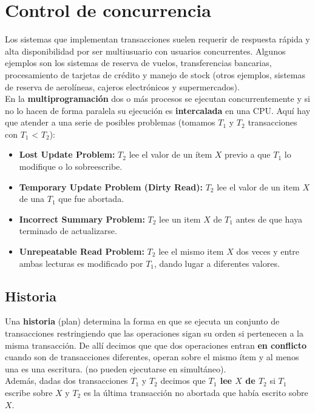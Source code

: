 \section*{Control de concurrencia}
Los sistemas que implementan transacciones suelen requerir de respuesta rápida y alta disponibilidad por ser multiusuario con usuarios concurrentes. Algunos ejemplos son los sistemas de reserva de vuelos, transferencias bancarias, procesamiento de tarjetas de crédito y manejo de stock (otros ejemplos, sistemas de reserva de aerolíneas, cajeros electrónicos y supermercados). \\
En la \textbf{multiprogramación} dos o más procesos se ejecutan concurrentemente y si no lo hacen de forma paralela su ejecución es \textbf{intercalada} en una CPU. Aquí hay que atender a una serie de posibles problemas (tomamos $T_1$ y $T_2$ transacciones con $T_1$ < $T_2$):
\begin{itemize}
    \item \textbf{Lost Update Problem:} $T_2$ lee el valor de un ítem $X$ previo a que $T_1$ lo modifique o lo sobreescribe.
    \item \textbf{Temporary Update Problem (Dirty Read):} $T_2$ lee el valor de un item $X$ de una $T_1$ que fue abortada.
    \item \textbf{Incorrect Summary Problem:} $T_2$ lee un item $X$ de $T_1$ antes de que haya terminado de actualizarse.
    \item \textbf{Unrepeatable Read Problem:} $T_2$ lee el mismo item $X$ dos veces y entre ambas lecturas es modificado por $T_1$, dando lugar a diferentes valores.
\end{itemize}

\subsection*{Historia}
Una \textbf{historia} (plan) determina la forma en que se ejecuta un conjunto de transacciones restringiendo que las operaciones sigan su orden si pertenecen a la misma transacción. De allí decimos que que dos operaciones entran \textbf{en conflicto} cuando son de transacciones diferentes, operan sobre el mismo ítem y al menos una es una escritura. (no pueden ejecutarse en simultáneo). \\
Además, dadas dos transacciones $T_1$ y $T_2$ decimos que \textbf{$T_1$ lee $X$ de $T_2$} si $T_1$ escribe sobre $X$ y $T_2$ es la última transacción no abortada que había escrito sobre $X$.

